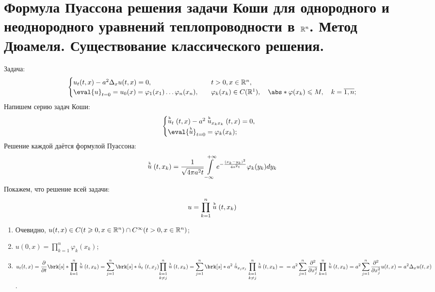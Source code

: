\section{Формула Пуассона решения задачи Коши для однородного и неоднородного уравнений теплопроводности в $\mathbb{R}^n$. Метод Дюамеля. Существование классического решения.}
Задача:
\begin{equation} \label{10_1}
\begin{cases}
	u_t(t,x) - a^2\Delta_xu(t,x) = 0, \quad & t > 0, x \in \R^n, \\
    \eval{u}_{t=0} = u_0(x) = \varphi_1(x_1) \ldots \varphi_n(x_n), \quad & \varphi_k(x_k) \in C(\R^1), \quad \abs*{\varphi(x_k)} \leqslant M, \quad k = \overline{1,n};
\end{cases}
\end{equation}
Напишем серию задач Коши:
\def \uk {\stackrel{\text{\tiny{k}}}{u}}
\def \uj {\stackrel{\text{\tiny{j}}}{u}}
\begin{equation}
\begin{cases}
	\uk_t(t,x) - a^2\uk_{x_kx_k}(t,x) = 0, \\
    \eval{\uk}_{t=0} = \varphi_k(x_k);
\end{cases}
\end{equation}
Решение каждой даётся формулой Пуассона:
\begin{equation}
	\uk(t,x_k) = \dfrac{1}{\sqrt{4\pi a^2t}} \int\limits_{-\infty}^{+\infty} e^{-\frac{(x_k - y_k)^2}{4a^2t}}\varphi_k(y_k)dy_k
\end{equation}
Покажем, что решение всей задачи:
\begin{equation*}
	u = \prod_{k=1}^n \uk(t,x_k)
\end{equation*}
\begin{enumerate}
	\item Очевидно, $u(t,x) \in C(t \geqslant 0, x \in \mathbb{R}^n) \cap C^\infty(t > 0, x \in \mathbb{R}^n)$;
    \item $u(0,x) = \displaystyle\prod_{k=1}^n \varphi_k(x_k)$;
    \item $u_t(t,x) = \dfrac{\partial}{\partial t} \brk[s]*{\displaystyle\prod_{k=1}^n \uk(t,x_k)} = \displaystyle\sum_{j=1}^n \brk[s]*{\uj_t(t,x_j) \displaystyle\underset{k \not= j}{\prod_{k=1}^n} \uk(t,x_k)} = \displaystyle\sum_{j=1}^n \brk[s]*{a^2 \uj_{x_jx_j} \displaystyle\underset{k \not= j}{\prod_{k=1}^n} \uk(t,x_k)} = \\ = a^2 \displaystyle\sum_{j=1}^n \dfrac{\partial^2}{\partial x_j^2} \displaystyle\prod_{k=1}^n \uk(t,x_k) = a^2 \displaystyle \sum_{j=1}^n \dfrac{\partial^2}{\partial x_j^2} u(t,x) = a^2 \Delta_x u(t,x)$.
\end{enumerate}
